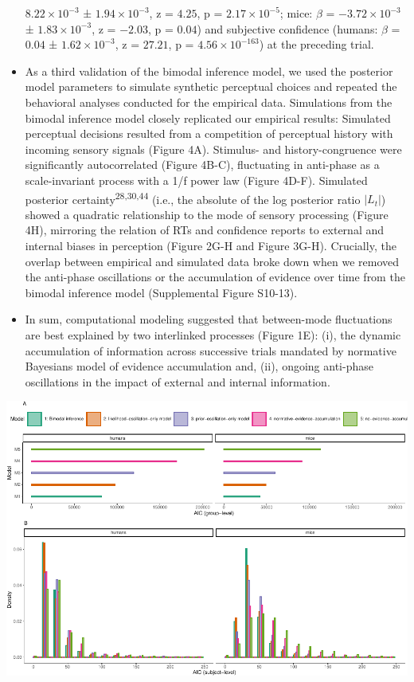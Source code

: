 \documentclass[
]{article}
\begin{document}
\begin{itemize}
  \(\ensuremath{8.22\times 10^{-3}}\) ±
  \(\ensuremath{1.94\times 10^{-3}}\), z = \(4.25\), p =
  \(\ensuremath{2.17\times 10^{-5}}\); mice: \(\beta\) =
  \(\ensuremath{-3.72\times 10^{-3}}\) ±
  \(\ensuremath{1.83\times 10^{-3}}\), z = \(-2.03\), p = \(0.04\)) and
  subjective confidence (humans: \(\beta\) = \(0.04\) ±
  \(\ensuremath{1.62\times 10^{-3}}\), z = \(27.21\), p =
  \(\ensuremath{4.56\times 10^{-163}}\)) at the preceding trial.
\item
  As a third validation of the bimodal inference model, we used the
  posterior model parameters to simulate synthetic perceptual choices
  and repeated the behavioral analyses conducted for the empirical data.
  Simulations from the bimodal inference model closely replicated our
  empirical results: Simulated perceptual decisions resulted from a
  competition of perceptual history with incoming sensory signals
  (Figure 4A). Stimulus- and history-congruence were significantly
  autocorrelated (Figure 4B-C), fluctuating in anti-phase as a
  scale-invariant process with a 1/f power law (Figure 4D-F). Simulated
  posterior certainty\textsuperscript{28,30,44} (i.e., the absolute of
  the log posterior ratio \(|L_t|\)) showed a quadratic relationship to
  the mode of sensory processing (Figure 4H), mirroring the relation of
  RTs and confidence reports to external and internal biases in
  perception (Figure 2G-H and Figure 3G-H). Crucially, the overlap
  between empirical and simulated data broke down when we removed the
  anti-phase oscillations or the accumulation of evidence over time from
  the bimodal inference model (Supplemental Figure S10-13).
\item
  In sum, computational modeling suggested that between-mode
  fluctuations are best explained by two interlinked processes (Figure
  1E): (i), the dynamic accumulation of information across successive
  trials mandated by normative Bayesians model of evidence accumulation
  and, (ii), ongoing anti-phase oscillations in the impact of external
  and internal information.
\end{itemize}

\includegraphics{modes_mouse_rev1b_clean_files/figure-latex/Supplemental_Figure_S9_print-1.pdf}
\end{document}

